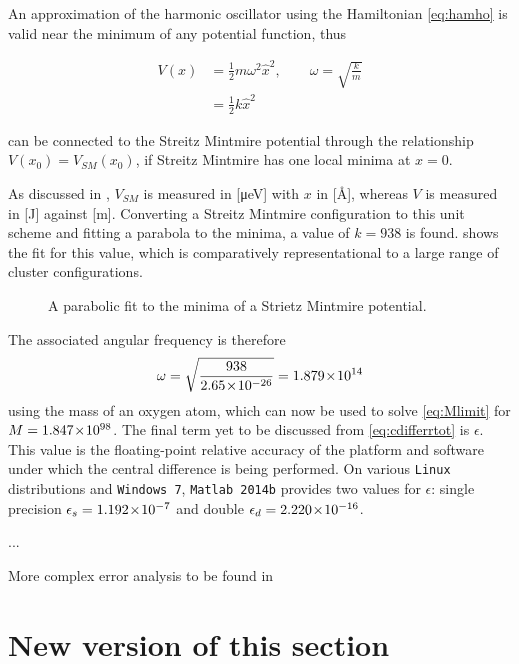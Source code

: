 An approximation of the harmonic oscillator using the Hamiltonian \cref{eq:hamho} is valid near the minimum of any potential function, thus

\begin{align}
V(x) &= \frac{1}{2}m\omega^2\hat{x}^2, \qquad \omega=\sqrt{\frac{k}{m}}\label{eq:vharm}\\
     &= \frac{1}{2}k\hat{x}^2
\end{align}

can be connected to the Streitz Mintmire potential through the relationship $V(x_{0})=V_{SM}(x_{0})$, if Streitz Mintmire has one local minima at $x=0$.

As discussed in , $V_{SM}$ is measured in [μeV] with $x$ in [Å], whereas $V$ is measured in [J] against [m].
Converting a Streitz Mintmire configuration to this unit scheme and fitting a parabola to the minima, a value of $k=938$ is found.
 shows the fit for this value, which is comparatively representational to a large range of cluster configurations.

\begin{figure}[htp]
\centering
\hspace{-1cm}\resizebox{0.7\columnwidth}{!}{}
\caption[Harmonic Approximation to Strietz Mintmire]{\label{fig:harmsm}A parabolic fit to the minima of a  Strietz Mintmire potential.}
\end{figure}

The associated angular frequency is therefore
\begin{equation}
\omega=\sqrt{\frac{938}{2.65\!\times\!10^{-26}}}=1.879\!\times\!10^{14}
\end{equation}
using the mass of an oxygen atom, which can now be used to solve \cref{eq:Mlimit} for $M = 1.847\!\times\!10^{98}$.
The final term yet to be discussed from \cref{eq:cdifferrtot} is $\epsilon$.
This value is the floating-point relative accuracy of the platform and software under which the central difference is being performed.
On various \texttt{Linux} distributions and \texttt{Windows 7}, \texttt{Matlab 2014b} provides two values for $\epsilon$: single precision $\epsilon_s = 1.192\!\times\!10^{-7}$ and double $\epsilon_d = 2.220\!\times\!10^{-16}$.

...

More complex error analysis to be found in \cite{Mathur2012}


\section{New version of this section}

